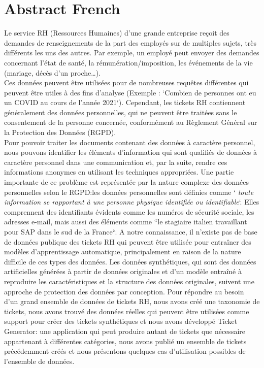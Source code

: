 \chapter*{Abstract French}

Le service RH (Ressources Humaines) d'une grande entreprise reçoit des demandes de renseignements de la part des employés sur de multiples sujets, très différents les uns des autres. Par exemple, un employé peut envoyer des demandes concernant l'état de santé, la rémunération/imposition, les événements de la vie (mariage, décès d'un proche\dots). \\
Ces données peuvent être utilisées pour de nombreuses requêtes différentes qui peuvent être utiles à des fins d'analyse (Exemple : `Combien de personnes ont eu un COVID au cours de l'année 2021`). Cependant, les tickets RH contiennent généralement des données personnelles, qui ne peuvent être traitées sans le consentement de la personne concernée, conformément au Règlement Général sur la Protection des Données (RGPD). \\
Pour pouvoir traiter les documents contenant des données à caractère personnel, nous pouvons identifier les éléments d'information qui sont qualifiés de données à caractère personnel dans une communication et, par la suite, rendre ces informations anonymes en utilisant les techniques appropriées.
Une partie importante de ce problème est représentée par la nature complexe des données personnelles selon le RGPD:\@ les données personnelles sont définies comme `\textit{  toute information se rapportant à une personne physique identifiée ou identifiable}`. Elles comprennent des identifiants évidents comme les numéros de sécurité sociale, les adresses e-mail, mais aussi des éléments comme ``le stagiaire italien travaillant pour SAP dans le sud de la France``.
A notre connaissance, il n'existe pas de base de données publique des tickets RH qui peuvent être utilisée pour entraîner des modèles d'apprentissage automatique, principalement en raison de la nature difficile de ces types des données. Les données synthétiques, qui sont des données artificielles générées à partir de données originales et d'un modèle entraîné à reproduire les caractéristiques et la structure des données originales, suivent une approche de protection des données par conception.
Pour répondre au besoin d'un grand ensemble de données de tickets RH, nous avons créé une taxonomie de tickets, nous avons trouvé des données réelles qui peuvent être utilisées comme support pour créer des tickets synthétiques et nous avons développé Ticket Generator: une application qui peut produire autant de tickets que nécessaire appartenant à différentes catégories, nous avons publié un ensemble de tickets précédemment créés et nous présentons quelques cas d'utilisation possibles de l'ensemble de données.